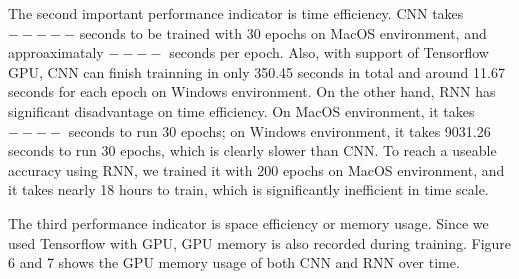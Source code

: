 \documentclass[letterpaper]{article} %
\begin{document}
The second important performance indicator is time efficiency. CNN takes $-----$ seconds to be trained with 30 epochs on MacOS environment, and approaximataly $----$ seconds per epoch. Also, with support of Tensorflow GPU, CNN can finish trainning in only 350.45 seconds in total and around 11.67 seconds for each epoch on Windows environment. On the other hand, RNN has significant disadvantage on time efficiency. On MacOS environment, it takes $----$ seconds to run 30 epochs; on Windows environment, it takes 9031.26 seconds to run 30 epochs, which is clearly slower than CNN. To reach a useable accuracy using RNN, we trained it with 200 epochs on MacOS environment, and it takes nearly 18 hours to train, which is significantly inefficient in time scale.

The third performance indicator is space efficiency or memory usage. Since we used Tensorflow with GPU, GPU memory is also recorded during training. Figure 6 and 7 shows the GPU memory usage of both CNN and RNN over time.


\newpage


\end{document}
